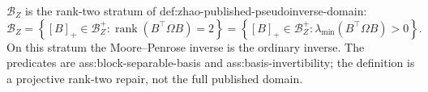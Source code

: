 \(\mathcal B_Z\) is the rank-two stratum of def:zhao-published-pseudoinverse-domain:
\[
 \mathcal B_Z=
 \left\{[B]_+\in\mathcal B_Z^+:
 \operatorname{rank}(B^{\top}\Omega B)=2\right\}
 =\left\{[B]_+\in\mathcal B_Z^+:\lambda_{\min}(B^{\top}\Omega B)>0\right\}.
\]
On this stratum the Moore--Penrose inverse is the ordinary inverse.  The predicates are ass:block-separable-basis and ass:basis-invertibility; the definition is a projective rank-two repair, not the full published domain.